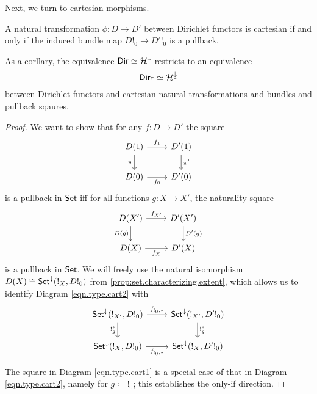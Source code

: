 Next, we turn to cartesian morphisms.
\begin{prop}\label{prop:type.dirichlet.cartesian.iff.bundle.cartesian}
A natural transformation $\phi : D \to D'$ between Dirichlet functors is
cartesian if and only if the induced bundle map $D!_0 \to D'!_0$ is a pullback.

As a corllary, the equivalence $\operatorname{\mathsf{{Dir}}} \simeq \operatorname{\mathcal{H}}^{\mathbin{\downarrow}}$ restricts to an
equivalence
$$\operatorname{\mathsf{{Dir}}}_{\ulcorner} \simeq \operatorname{\mathcal{H}}^{\mathbin{\downarrow}}_{\ulcorner}$$
between Dirichlet functors and cartesian natural transformations and bundles and
pullback sqaures.
\end{prop}
\begin{proof}
We want to show that for any $f\colon D\to D'$ the square
\begin{equation}\label{eqn.type.cart1}
\begin{tikzcd}
	D(1)\ar[r, "f_1"]\ar[d, "\pi"']&
	D'(1)\ar[d, "\pi'"]\\
	D(0)\ar[r, "f_0"']&
	D'(0)
\end{tikzcd}
\end{equation}
is a pullback in $\operatorname{\mathsf{{Set}}}$ iff for all functions $g\colon X\to X'$, the naturality square
\begin{equation}\label{eqn.type.cart2}
\begin{tikzcd}
  D(X')\ar[r, "f_{X'}"]\ar[d, "D(g)"']&
  D'(X')\ar[d, "D'(g)"]\\
  D(X)\ar[r, "f_X"']&
  D'(X)
\end{tikzcd}
\end{equation}
is a pullback in $\operatorname{\mathsf{{Set}}}$. We will freely use the natural isomorphism
$D(X)\cong\operatorname{\mathsf{{Set}}}^{\mathbin{\downarrow}}(!_X, D!_0)$ from
\ref{prop:set.characterizing.extent}, which allows us to identify Diagram
\ref{eqn.type.cart2} with
\begin{equation}\label{eqn.cart3}
\begin{tikzcd}
 \Set^{\down}(!_{X'}, D!_0)     \ar[r, "f_{!_0,\ast}"]\ar[d, "!_g^{\ast}"']& \Set^{\down}(!_{X'}, D'!_0)
  \ar[d, "!_{g}^{\ast}"]\\
  \Set^{\down}(!_{X}, D!_0)\ar[r, "f_{!_0, \ast}"']&
 \Set^{\down}(!_X, D'!_0) 
\end{tikzcd}
\end{equation}

The square in Diagram \ref{eqn.type.cart1} is a
special case of that in Diagram \ref{eqn.type.cart2}, namely for $g\coloneqq !_0$;
this establishes the only-if direction. 


\end{proof}

